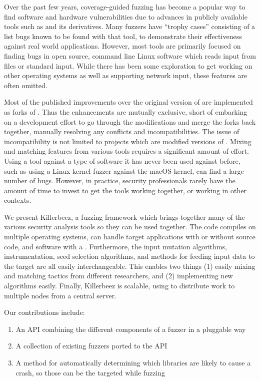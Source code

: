 Over the past few years, coverage-guided fuzzing has become a popular way to
find software and hardware vulnerabilities due to advances in publicly
available tools such as \AFL{}\cite{afl} and its derivatives.\cite{vanhauser} Many
fuzzers have ``trophy cases'' consisting of a list bugs known to be found with that tool, to
demonstrate their effectiveness against real world applications.  However, most
tools are primarily focused on finding bugs in open source, command line Linux
software which reads input from files or standard input. While there has been some
exploration to get \AFL{} working on other operating
systems\cite{aflosx}\cite{winafl} as well as supporting network
input,\cite{netafl}\cite{preeny} these features are often omitted.

Most of the published improvements over the original version of \AFL{} are
implemented as forks of
\AFL{}.\cite{aflfast}\cite{aflgo}\cite{fairfuzz}\cite{perffuzz}\cite{pythia}\cite{collafl}
Thus the enhancements are mutually exclusive, short of embarking on a
development effort to go through the modifications and merge the forks back
together, manually resolving any conflicts and incompatibilities.  The issue
of incompatibility is not limited to projects which are modified versions of
\AFL{}. Mixing and matching features from various tools requires a significant
amount of effort. Using a tool against a type of software it has never been
used against before, such as using a Linux kernel fuzzer against the macOS
kernel, can find a large number of bugs.  However, in practice, security
professionals rarely have the amount of time to invest to get the tools working
together, or working in other contexts.

We present Killerbeez, a fuzzing framework which brings together many of the
various security analysis tools so they can be used together.  The code
compiles on multiple operating systems, can handle target applications with or
without source code, and software with a \GUI{}.
Furthermore, the input mutation algorithms, instrumentation, seed selection
algorithms, and methods for feeding input data to the target are all easily
interchangeable.  This enables two things (1) easily mixing and matching
tactics from different researchers, and (2) implementing new algorithms easily.
Finally, Killerbeez is scalable, using \BOINC{}\cite{boinc} to distribute work
to multiple nodes from a central server.

Our contributions include:
\begin{enumerate}[noitemsep]
\item An API combining the different components of a fuzzer in a pluggable way
\item A collection of existing fuzzers ported to the API
\item A method for automatically determining which libraries are likely to
	cause a crash, so those can be the targeted while fuzzing
\end{enumerate}
